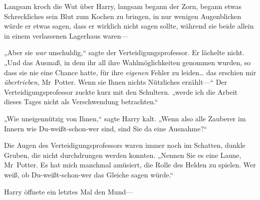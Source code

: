 Langsam kroch die Wut über Harry, langsam begann der Zorn, begann etwas Schreckliches sein Blut zum Kochen zu bringen, in nur wenigen Augenblicken würde er etwas sagen, dass er wirklich nicht sagen sollte, während sie beide allein in einem verlassenen Lagerhaus waren—

„Aber sie \emph{war} unschuldig,“ sagte der Verteidigungsprofessor. Er lächelte nicht. „Und das Ausmaß, in dem ihr all ihre Wahlmöglichkeiten genommen wurden, so dass sie nie eine Chance hatte, für ihre \emph{eigenen} Fehler zu leiden… das erschien mir \emph{übertrieben}, Mr~Potter. Wenn sie Ihnen nichts Nützliches erzählt—“ Der Verteidigungsprofessor zuckte kurz mit den Schultern. „werde ich die Arbeit dieses Tages nicht als Verschwendung betrachten.“

„Wie uneigennützig von Ihnen,“ sagte Harry kalt. „Wenn also alle Zauberer im Innern wie Du-weißt-schon-wer sind, sind Sie da eine Ausnahme?“

Die Augen des Verteidigungsprofessors waren immer noch im Schatten, dunkle Gruben, die nicht durchdrungen werden konnten. „Nennen Sie es eine Laune, Mr~Potter. Es hat mich manchmal amüsiert, die Rolle des Helden zu spielen. Wer weiß, ob Du-weißt-schon-wer das Gleiche sagen würde.“

Harry öffnete ein letztes Mal den Mund—


